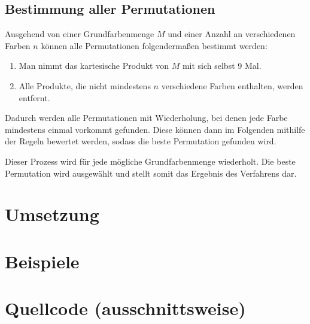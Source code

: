 \documentclass[a4paper,10pt,ngerman]{scrartcl}
\begin{document}
\subsection{Bestimmung aller Permutationen}
Ausgehend von einer Grundfarbenmenge $M$ und einer Anzahl an verschiedenen Farben $n$ können alle Permutationen folgendermaßen bestimmt werden:
\begin{enumerate}
  \item Man nimmt das kartesische Produkt von $M$ mit sich selbst 9 Mal.
  \item Alle Produkte, die nicht mindestens $n$ verschiedene Farben enthalten, werden entfernt.
\end{enumerate}

Dadurch werden alle Permutationen mit Wiederholung, bei denen jede Farbe mindestens einmal vorkommt gefunden.
Diese können dann im Folgenden mithilfe der Regeln bewertet werden, sodass die beste Permutation gefunden wird.

Dieser Prozess wird für jede mögliche Grundfarbenmenge wiederholt.
Die beste Permutation wird ausgewählt und stellt somit das Ergebnis des Verfahrens dar.



\section{Umsetzung}

\section{Beispiele}

\section{Quellcode (ausschnittsweise)}
\end{document}
